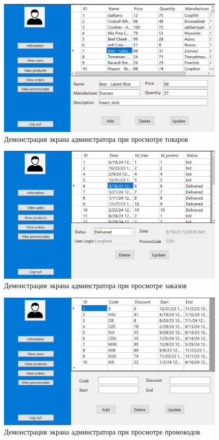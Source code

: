 \begin{figure}[h]
	\centering
	\includegraphics[height=0.4\textheight]{img/admin_5.png}
	\caption{Демонстрация экрана админстратора при просмотре товаров}
	\label{img:ex5}
\end{figure}

\begin{figure}[h]
	\centering
	\includegraphics[height=0.4\textheight]{img/admin_3.png}
	\caption{Демонстрация экрана админстратора при просмотре заказов}
	\label{img:ex6}
\end{figure}

\begin{figure}[h]
	\centering
	\includegraphics[height=0.4\textheight]{img/admin_4.png}
	\caption{Демонстрация экрана админстратора при просмотре промокодов}
	\label{img:ex7}
\end{figure}

